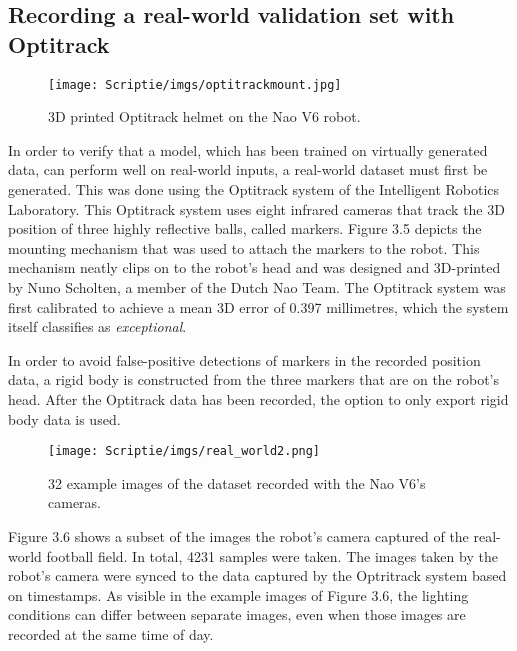 \documentclass{uva-inf-bachelor-thesis}
\begin{document}

        \subsection{Recording a real-world validation set with Optitrack}
            \begin{figure}[H]
            \centering
            \texttt{[image: Scriptie/imgs/optitrackmount.jpg]}
            \caption{3D printed Optitrack helmet on the Nao V6 robot.}
            \end{figure}

            In order to verify that a model, which has been trained on virtually generated data, can perform well on real-world inputs, a real-world dataset must first be generated. This was done using the Optitrack system of the Intelligent Robotics Laboratory. This Optitrack system uses eight infrared cameras that track the 3D position of three highly reflective balls, called markers. Figure 3.5 depicts the mounting mechanism that was used to attach the markers to the robot. This mechanism neatly clips on to the robot's head and was designed and 3D-printed by Nuno Scholten, a member of the Dutch Nao Team. The Optitrack system was first calibrated to achieve a mean 3D error of 0.397 millimetres, which the system itself classifies as \textit{exceptional}.
            
            In order to avoid false-positive detections of markers in the recorded position data, a rigid body is constructed from the three markers that are on the robot's head. After the Optitrack data has been recorded, the option to only export rigid body data is used. 

            \begin{figure}[H]
            \centering
            \texttt{[image: Scriptie/imgs/real\_world2.png]}
            \caption{32 example images of the dataset recorded with the Nao V6's cameras.}
            \end{figure}

            Figure 3.6 shows a subset of the images the robot's camera captured of the real-world football field. In total, 4231 samples were taken. The images taken by the robot's camera were synced to the data captured by the Optritrack system based on timestamps.
            As visible in the example images of Figure 3.6, the lighting conditions can differ between separate images, even when those images are recorded at the same time of day. 
\end{document}

